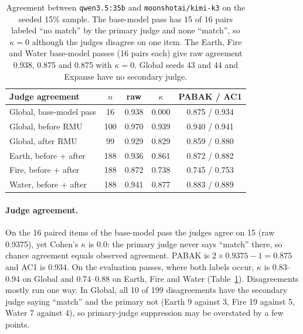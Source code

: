 \documentclass[10pt,twocolumn]{article}
\newcommand{\code}[1]{\texttt{#1}}
\begin{document}
\begin{table}[tbp]
\centering\footnotesize
\setlength{\tabcolsep}{3pt}
\begin{tabular}{@{}lcccc@{}}
\toprule
Judge agreement & $n$ & raw & $\kappa$ & PABAK / AC1\\
\midrule
Global, base-model pass & 16 & 0.938 & 0.000 & 0.875 / 0.934\\
Global, before RMU & 100 & 0.970 & 0.939 & 0.940 / 0.941\\
Global, after RMU & 99 & 0.929 & 0.829 & 0.859 / 0.880\\
Earth, before + after & 188 & 0.936 & 0.861 & 0.872 / 0.882\\
Fire, before + after & 188 & 0.872 & 0.738 & 0.745 / 0.753\\
Water, before + after & 188 & 0.941 & 0.877 & 0.883 / 0.889\\
\bottomrule
\end{tabular}
\caption{Agreement between \code{qwen3.5:35b} and \code{moonshotai/kimi-k3} on the seeded 15\% sample. The base-model pass has 15 of 16 pairs labeled ``no match'' by the primary judge and none ``match'', so $\kappa=0$ although the judges disagree on one item. The Earth, Fire and Water base-model passes (16 pairs each) give raw agreement 0.938, 0.875 and 0.875 with $\kappa=0$. Global seeds 43 and 44 and Expanse have no secondary judge.}
\label{tab:judge}
\end{table}

\paragraph{Judge agreement.} On the 16 paired items of the base-model pass the judges agree on 15 (raw 0.9375), yet Cohen's $\kappa$ is 0.0: the primary judge never says ``match'' there, so chance agreement equals observed agreement. PABAK is $2\times0.9375-1=0.875$ and AC1 is 0.934. On the evaluation passes, where both labels occur, $\kappa$ is 0.83--0.94 on Global and 0.74--0.88 on Earth, Fire and Water (Table~\ref{tab:judge}). Disagreements mostly run one way. In Global, all 10 of 199 disagreements have the secondary judge saying ``match'' and the primary not (Earth 9 against 3, Fire 19 against 5, Water 7 against 4), so primary-judge suppression may be overstated by a few points.
\end{document}
